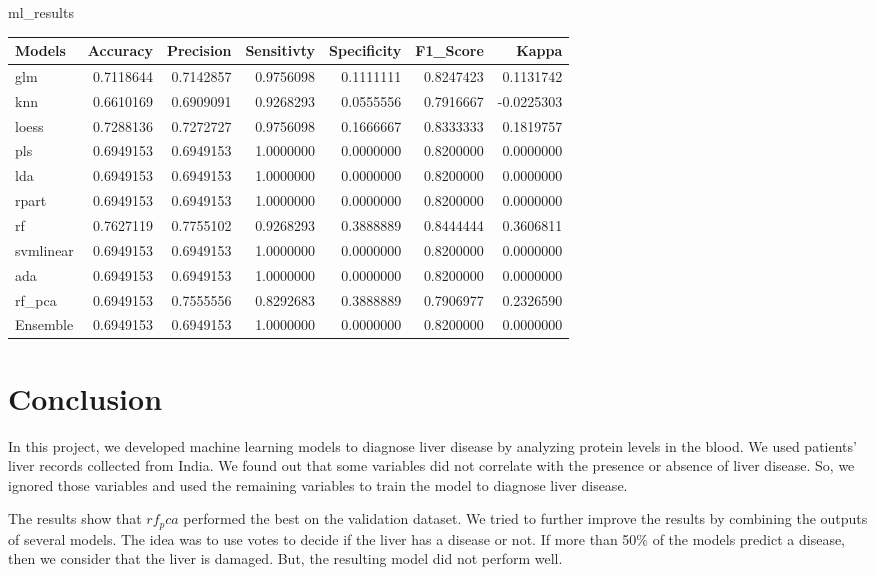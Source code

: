 \documentclass[]{article}
\newenvironment{Shaded}{\begin{snugshade}}{\end{snugshade}}
\newcommand{\NormalTok}[1]{#1}
\begin{document}
\begin{Shaded}
\begin{Highlighting}[]
\NormalTok{ml_results}
\end{Highlighting}
\end{Shaded}

\begin{longtable}[]{@{}lrrrrrr@{}}
\toprule
Models & Accuracy & Precision & Sensitivty & Specificity & F1\_Score &
Kappa\tabularnewline
\midrule
\endhead
glm & 0.7118644 & 0.7142857 & 0.9756098 & 0.1111111 & 0.8247423 &
0.1131742\tabularnewline
knn & 0.6610169 & 0.6909091 & 0.9268293 & 0.0555556 & 0.7916667 &
-0.0225303\tabularnewline
loess & 0.7288136 & 0.7272727 & 0.9756098 & 0.1666667 & 0.8333333 &
0.1819757\tabularnewline
pls & 0.6949153 & 0.6949153 & 1.0000000 & 0.0000000 & 0.8200000 &
0.0000000\tabularnewline
lda & 0.6949153 & 0.6949153 & 1.0000000 & 0.0000000 & 0.8200000 &
0.0000000\tabularnewline
rpart & 0.6949153 & 0.6949153 & 1.0000000 & 0.0000000 & 0.8200000 &
0.0000000\tabularnewline
rf & 0.7627119 & 0.7755102 & 0.9268293 & 0.3888889 & 0.8444444 &
0.3606811\tabularnewline
svmlinear & 0.6949153 & 0.6949153 & 1.0000000 & 0.0000000 & 0.8200000 &
0.0000000\tabularnewline
ada & 0.6949153 & 0.6949153 & 1.0000000 & 0.0000000 & 0.8200000 &
0.0000000\tabularnewline
rf\_pca & 0.6949153 & 0.7555556 & 0.8292683 & 0.3888889 & 0.7906977 &
0.2326590\tabularnewline
Ensemble & 0.6949153 & 0.6949153 & 1.0000000 & 0.0000000 & 0.8200000 &
0.0000000\tabularnewline
\bottomrule
\end{longtable}

\section{Conclusion}
\label{sec:conclusion}

In this project, we developed machine learning models to diagnose liver
disease by analyzing protein levels in the blood. We used patients'
liver records collected from India. We found out that some variables did
not correlate with the presence or absence of liver disease. So, we
ignored those variables and used the remaining variables to train the
model to diagnose liver disease.

The results show that \emph{$rf_pca$} performed the best on the
validation dataset. We tried to further improve the results by combining
the outputs of several models. The idea was to use votes to decide if
the liver has a disease or not. If more than 50\% of the models predict
a disease, then we consider that the liver is damaged. But, the
resulting model did not perform well.
\end{document}
